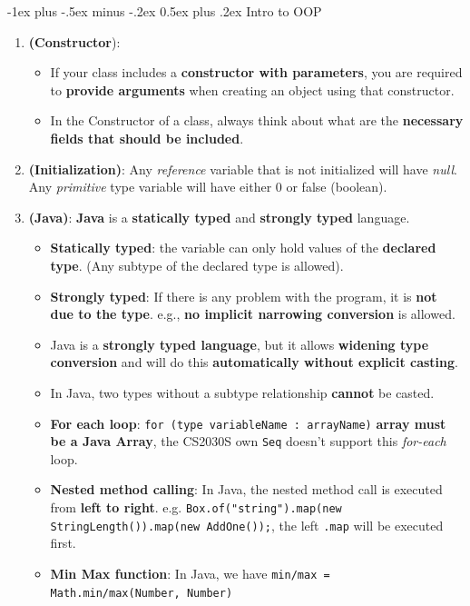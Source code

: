 \documentclass[10pt, landscape]{article}
\makeatletter
\renewcommand{\section}{\@startsection{section}{1}{0mm}%
                                {-1ex plus -.5ex minus -.2ex}%
                                {0.5ex plus .2ex}%
                                {\normalfont\large\bfseries}}
\makeatother
\begin{document}
\begin{multicols}{4}
\section{Intro to OOP}
\begin{enumerate}
    \item \textbf{(Constructor}): 
    \begin{itemize}
        \item If your class includes a \textbf{constructor with parameters}, you are required to \textbf{provide arguments} when creating an object using that constructor.
        \item In the Constructor of a class, always think about what are the \textbf{necessary fields that should be included}.
    \end{itemize}
    \item \textbf{(Initialization)}: Any \textit{reference} variable that is not initialized will have \textit{null}. Any \textit{primitive} type variable will have either 0 or false (boolean).
    \item \textbf{(Java)}: \textbf{Java} is a \textbf{statically typed} and \textbf{strongly typed} language.
    \begin{itemize}
        \item \textbf{Statically typed}: the variable can only hold values of the \textbf{declared type}. (Any subtype of the declared type is allowed).
        \item \textbf{Strongly typed}: If there is any problem with the program, it is \textbf{not due to the type}. e.g., \textbf{no implicit narrowing conversion} is allowed.
        \item Java is a \textbf{strongly typed language}, but it allows \textbf{widening type conversion} and will do this \textbf{automatically without explicit casting}.
        \item In Java, two types without a subtype relationship \textbf{cannot} be casted.
        \item \textbf{For each loop}: \texttt{for (type variableName : arrayName)} \textbf{array must be a Java Array}, the CS2030S own \texttt{Seq} doesn't support this \textit{for-each} loop.
        \item \textbf{Nested method calling}: In Java, the nested method call is executed from \textbf{left to right}. e.g. \texttt{Box.of("string").map(new StringLength()).map(new AddOne());}, the left \texttt{.map} will be executed first.
        \item \textbf{Min Max function}: In Java, we have \texttt{min/max = Math.min/max(Number, Number)}

\end{itemize}
\end{enumerate}
\end{multicols}
\end{document}
